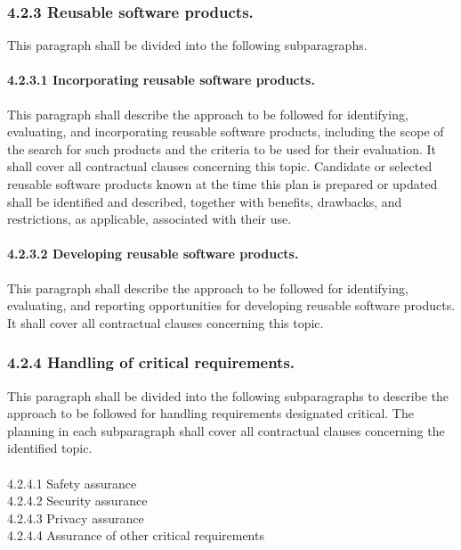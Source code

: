 \subsubsection{4.2.3 Reusable software products.}

This paragraph shall be divided into the following subparagraphs.

\paragraph{4.2.3.1 Incorporating reusable software products.}

This paragraph shall describe the approach to be followed for
identifying, evaluating, and incorporating reusable software products,
including the scope of the search for such products and the criteria to
be used for their evaluation. It shall cover all contractual clauses
concerning this topic. Candidate or selected reusable software products
known at the time this plan is prepared or updated shall be identified
and described, together with benefits, drawbacks, and restrictions, as
applicable, associated with their use.

\paragraph{4.2.3.2 Developing reusable software products.}

This paragraph shall describe the approach to be followed for
identifying, evaluating, and reporting opportunities for developing
reusable software products. It shall cover all contractual clauses
concerning this topic.

\subsubsection{4.2.4 Handling of critical requirements.}

This paragraph shall be divided into the following subparagraphs to
describe the approach to be followed for handling requirements
designated critical. The planning in each subparagraph shall cover all
contractual clauses concerning the identified topic. \\\\ 4.2.4.1 Safety
assurance \\ 4.2.4.2 Security assurance \\ 4.2.4.3 Privacy assurance \\
4.2.4.4 Assurance of other critical requirements

